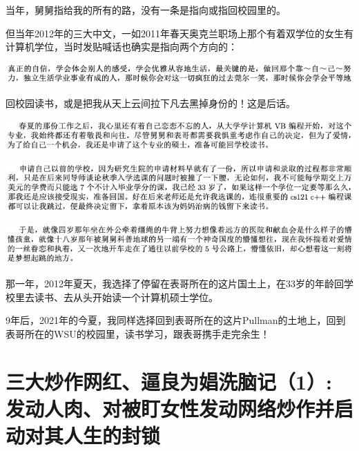 \documentclass[9pt, b5paper]{article}
\begin{document}
当年，舅舅指给我的所有的路，没有一条是指向或指回校园里的。

但当年2012年的三大中文，一如2011年春天奥克兰职场上那个有着双学位的女生有计算机学位，当时发贴喊话也确实是指向两个方向的：

\begin{center}
\includegraphics[width=.9\linewidth]{./pic/backups_plans_20210416_103455.png}
\end{center}

回校园读书，或是把我从天上云间拉下凡去黑掉身份的！这是后话。 

\begin{center}
\includegraphics[width=.9\linewidth]{./pic/backups_plans_20210414_161755.png}
\end{center}

\begin{center}
\includegraphics[width=.9\linewidth]{./pic/backups_plans_20210414_161857.png}
\end{center}

\begin{center}
\includegraphics[width=.9\linewidth]{./pic/backups_plans_20210414_161940.png}
\end{center}

那一年，2012年夏天，我选择了停留在表哥所在的这片国土上，在33岁的年龄回学校里去读书、去从头开始读一个计算机硕士学位。

9年后，2021年的今夏，我同样选择回到表哥所在的这片Pullman的土地上，回到表哥所在的WSU的校园里，读书学习，跟表哥携手走完余生！


\section{三大炒作网红、逼良为娼洗脑记（1）: 发动人肉、对被盯女性发动网络炒作并启动对其人生的封锁}
\label{sec:org9f81f1e}
\end{document}

